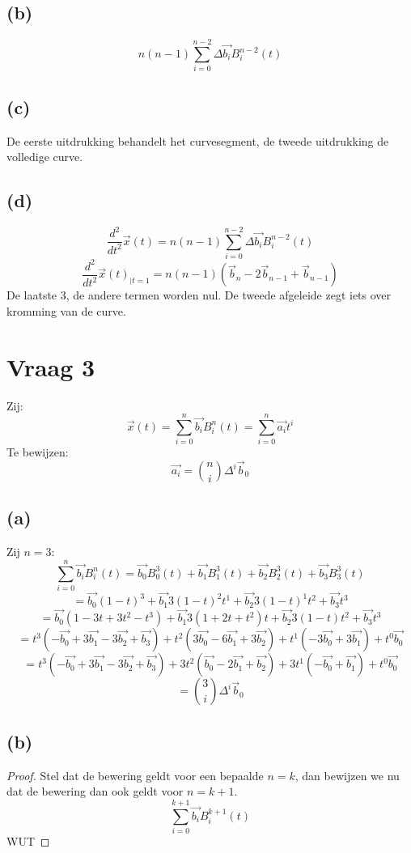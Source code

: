 \documentclass[10pt,a4paper]{article}
\begin{document}
\subsection*{(b)}
\[
n(n-1)
\sum_{i=0}^{n-2}\Delta\vec{b_{i}}B^{n-2}_{i}(t)
\]

\subsection*{(c)}
De eerste uitdrukking behandelt het curvesegment, de tweede uitdrukking de volledige curve.


\subsection*{(d)}
$$
\frac{d^2}{dt^2}\vec{x}(t) = n(n-1)
\sum_{i=0}^{n-2}\Delta\vec{b_{i}}B^{n-2}_{i}(t)
$$
$$
\frac{d^2}{dt^2}\vec{x}(t)_{|t=1} = n(n-1)
(\vec{b}_n - 2\vec{b}_{n-1} + \vec{b}_{n-1})
$$
De laatste 3, de andere termen worden nul. De tweede afgeleide zegt iets over kromming van de curve.

\section{Vraag 3}
Zij:
\[
\vec{x}(t) = \sum_{i=0}^{n}\vec{b_{i}}B^{n}_{i}(t) = \sum_{i=0}^{n}\vec{a_{i}}t^i
\]
Te bewijzen:
\[
\vec{a_i} = \binom{n}{i}\Delta^i\vec{b}_0
\]
\subsection*{(a)}
Zij $n=3$:
\[
\sum_{i=0}^{n}\vec{b_{i}}B^{n}_{i}(t)
= \vec{b_{0}}B^{3}_{0}(t)
+ \vec{b_{1}}B^{3}_{1}(t)
+ \vec{b_{2}}B^{3}_{2}(t)
+ \vec{b_{3}}B^{3}_{3}(t)
\]
\[
= \vec{b_{0}}(1-t)^{3}
+ \vec{b_{1}}3(1-t)^{2}t^{1}
+ \vec{b_{2}}3(1-t)^{1}t^{2}
+ \vec{b_{3}}t^{3}
\]
\[
= \vec{b_{0}}(1-3t+3t^2-t^3)
+ \vec{b_{1}}3(1+2t+t^2)t
+ \vec{b_{2}}3(1-t)t^{2}
+ \vec{b_{3}}t^{3}
\]
\[
= t^3(- \vec{b_0}+3\vec{b_1}-3\vec{b_2}+\vec{b_3})
+ t^2( 3\vec{b_0}-6\vec{b_1}+3\vec{b_2})
+ t^1(-3\vec{b_0}+3\vec{b_1})
+ t^0   \vec{b_0}
\]
\[
=  t^3(-\vec{b_0}+3\vec{b_1}-3\vec{b_2}+\vec{b_3})
+ 3t^2( \vec{b_0}-2\vec{b_1}+ \vec{b_2})
+ 3t^1(-\vec{b_0}+ \vec{b_1})
+  t^0  \vec{b_0}
\]
\[
= \binom{3}{i}\Delta^i\vec{b}_0
\]

\subsection*{(b)}
\begin{proof}
Stel dat de bewering geldt voor een bepaalde $n=k$, dan bewijzen we nu dat de bewering dan ook geldt voor $n=k+1$.
\[
\sum_{i=0}^{k+1}\vec{b_{i}}B^{k+1}_{i}(t)
\]
WUT
\end{proof}
\end{document}
